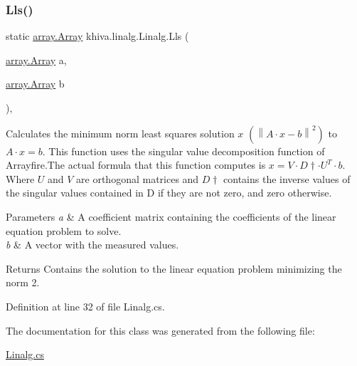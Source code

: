 \subsubsection{\texorpdfstring{Lls()}{Lls()}}
{\footnotesize\ttfamily static \mbox{\hyperlink{classkhiva_1_1array_1_1_array}{array.\+Array}} khiva.\+linalg.\+Linalg.\+Lls (\begin{DoxyParamCaption}\item[{\mbox{\hyperlink{classkhiva_1_1array_1_1_array}{array.\+Array}}}]{a,  }\item[{\mbox{\hyperlink{classkhiva_1_1array_1_1_array}{array.\+Array}}}]{b }\end{DoxyParamCaption})\hspace{0.3cm}{\ttfamily [inline]}, {\ttfamily [static]}}



Calculates the minimum norm least squares solution $x$ $(\left\lVert{A·x - b}\right\rVert^2)$ to $A·x = b$. This function uses the singular value decomposition function of Arrayfire.\+The actual formula that this function computes is $x = V·D\dagger·U^T·b$. Where $U$ and $V$ are orthogonal matrices and $D\dagger$ contains the inverse values of the singular values contained in D if they are not zero, and zero otherwise. 


\begin{DoxyParams}{Parameters}
{\em a} & A coefficient matrix containing the coefficients of the linear equation problem to solve.\\
\hline
{\em b} & A vector with the measured values.\\
\hline
\end{DoxyParams}
\begin{DoxyReturn}{Returns}
Contains the solution to the linear equation problem minimizing the norm 2.
\end{DoxyReturn}


Definition at line 32 of file Linalg.\+cs.



The documentation for this class was generated from the following file\+:\begin{DoxyCompactItemize}
\item 
\mbox{\hyperlink{_linalg_8cs}{Linalg.\+cs}}\end{DoxyCompactItemize}
